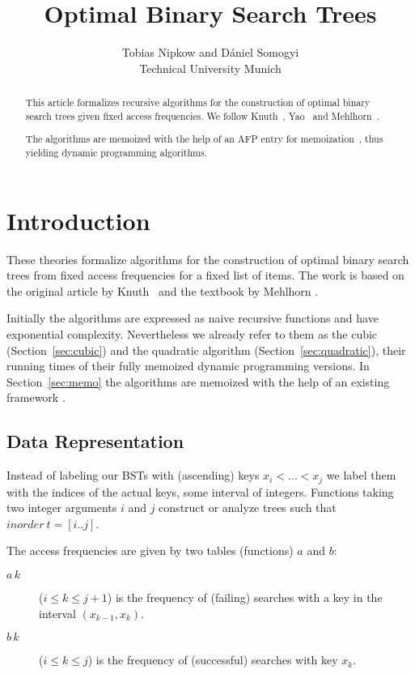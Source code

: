 \documentclass[11pt,a4paper]{article}
\begin{document}
\title{Optimal Binary Search Trees}
\author{Tobias Nipkow and D\'aniel Somogyi\\
  Technical University Munich}

\maketitle

\begin{abstract}
This article formalizes recursive algorithms for the construction
of optimal binary search trees given fixed access frequencies.
We follow Knuth~\cite{Knuth71}, Yao~\cite{Yao80} and
Mehlhorn~\cite{Mehlhorn84}.

The algorithms are memoized with the help of an AFP entry for
memoization~\cite{Monad_Memo_DP-AFP}, thus yielding dynamic programming algorithms.
\end{abstract}

\tableofcontents

\section{Introduction}

These theories formalize algorithms for the construction of optimal binary search trees
from fixed access frequencies for a fixed list of items. The work is based on the original
article by Knuth~\cite{Knuth71} and the textbook by Mehlhorn \cite[Part III, Chapter 4]{Mehlhorn84}.

Initially the algorithms are expressed as naive recursive functions
and have exponential complexity. Nevertheless we already refer to them
as the cubic (Section~\ref{sec:cubic}) and the quadratic algorithm
(Section~\ref{sec:quadratic}), their running times of their fully memoized
dynamic programming versions. In Section~\ref{sec:memo} the algorithms
are memoized with the help of an existing framework \cite{Monad_Memo_DP-AFP}.

\subsection{Data Representation}

Instead of labeling our BSTs with (ascending) keys $x_i < \dots < x_j$ we label them with
the indices of the actual keys, some interval of integers.
Functions taking two integer arguments $i$ and $j$ construct or analyze trees such that
$\textit{inorder}\ t = [i..j]$.

The access frequencies are given by two tables (functions) $a$ and $b$:
\begin{description}
\item[$a\, k$] ($i \le k \le j+1$) is the frequency of (failing) searches with a key in the interval
  $(x_{k-1},x_k)$.
\item[$b\, k$] ($i \le k \le j$) is the frequency of (successful) searches with key $x_k$.
\end{description}





\end{document}
